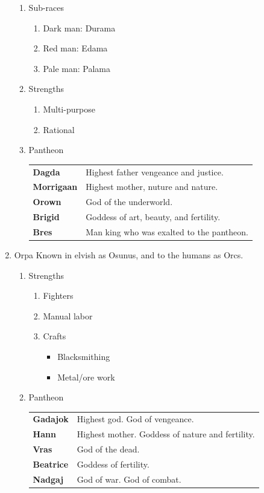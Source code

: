 \documentclass[11pt]{article}
\begin{document}
\begin{enumerate}
\begin{enumerate}
\item Sub-races
\label{sec:org9397d29}
\begin{enumerate}
\item Dark man: Durama
\item Red man: Edama
\item Pale man: Palama
\end{enumerate}
\item Strengths
\label{sec:orga9c64bd}
\begin{enumerate}
\item Multi-purpose
\item Rational
\end{enumerate}
\item Pantheon
\label{sec:orgf6db8b8}
\begin{center}
\begin{tabular}{ll}
\textbf{Dagda} & Highest father vengeance and justice.\\[0pt]
\textbf{Morrigaan} & Highest mother, nuture and nature.\\[0pt]
\textbf{Orown} & God of the underworld.\\[0pt]
\textbf{Brigid} & Goddess of art, beauty, and fertility.\\[0pt]
\textbf{Bres} & Man king who was exalted to the pantheon.\\[0pt]
\end{tabular}
\end{center}
\end{enumerate}
\item Orpa
\label{sec:orged61fb5}
Known in elvish as Osunus, and to the humans as Orcs.
\begin{enumerate}
\item Strengths
\label{sec:org174446d}
\begin{enumerate}
\item Fighters
\item Manual labor
\item Crafts
\begin{itemize}
\item Blacksmithing
\item Metal/ore work
\end{itemize}
\end{enumerate}
\item Pantheon
\label{sec:org55c5924}
\begin{center}
\begin{tabular}{ll}
\textbf{Gadajok} & Highest god. God of vengeance.\\[0pt]
\textbf{Hann} & Highest mother. Goddess of nature and fertility.\\[0pt]
\textbf{Vras} & God of the dead.\\[0pt]
\textbf{Beatrice} & Goddess of fertility.\\[0pt]
\textbf{Nadgaj} & God of war. God of combat.\\[0pt]
\end{tabular}
\end{center}
\end{enumerate}
\end{enumerate}
\end{document}
